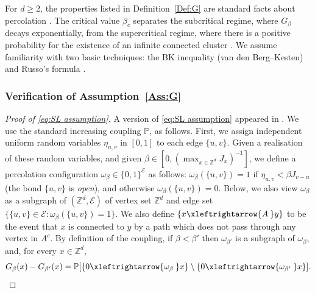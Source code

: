 \documentclass[11pt,a4paper]{article}
\numberwithin{equation}{section}
\theoremstyle{plain}
\theoremstyle{definition}
\newcommand\1{\mathds{1}}
\newcommand{\connect}{\xleftrightarrow}
\begin{document}
For $d \ge 2$,
the properties listed in Definition~\ref{Def:G} are standard facts about
percolation \cite{Grim99}.  The critical value $\beta_c$ separates the subcritical regime,
where $G_\beta$ decays exponentially, from the supercritical regime, where
there is a positive probability for the existence of an infinite connected
cluster \cite{Mens86,AB87}. We assume familiarity with two basic techniques: the BK inequality (van den Berg--Kesten) and Russo's formula \cite[Chapter~2]{Grim99}.

 \subsubsection{Verification of Assumption~\ref{Ass:G}}

\begin{proof}[Proof of \eqref{eq:SL assumption}]
A version of \eqref{eq:SL assumption} appeared in \cite[Lemma~2.4]{Hutc19_hyperbolic}.
We use the standard increasing coupling $\mathbb P$, as follows.
First, we assign independent uniform random variables $\eta_{u,v}$ in $[0,1]$ to each edge $\{u,v\}$.
Given a realisation of these random variables, and given $\beta\in [0,(\max_{x\in \mathbb Z^d} J_x)^{-1}]$, we define a percolation configuration $\omega_\beta\in \{0,1\}^{\mathcal E}$ as follows: $\omega_\beta(\{u,v\})=1$  if
$\eta_{u,v}<  \beta J_{v-u}$ (the bond $\{u,v\}$ is \emph{open}), and otherwise $\omega_\beta(\{u,v\})=0$. Below, we also view $\omega_\beta$ as a subgraph of $(\mathbb Z^d,\mathcal E)$ of vertex set $\mathbb Z^d$ and edge set $\{\{u,v\}\in \mathcal E: \omega_\beta(\{u,v\})=1\}$. We also define $\{x \connect{A\:} y\}$
 to be the event that $x$ is connected to $y$
by a path which does not pass through any vertex in $A^c$.
By definition of the coupling, if $\beta<\beta'$ then $\omega_{\beta'}$ is a subgraph of $\omega_\beta$, and, for every $x\in \mathbb Z^d$,
		\begin{equation}\label{eq:proof sl perco 1}
			G_\beta(x)-G_{\beta'}(x) = \mathbb{P}[ \{0\connect{\omega_\beta\:}x\}\setminus\{0\connect{\omega_{\beta'}\:} x\}].
		\end{equation}


\end{proof}
\end{document}
